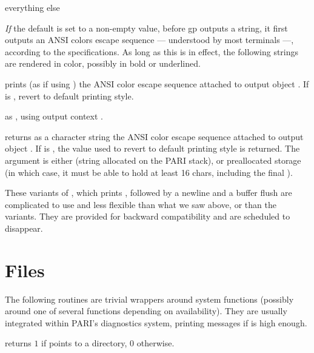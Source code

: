 \item {} everything else

\emph{If} the  default is set to a non-empty value, before gp
outputs a string, it first outputs an ANSI colors escape sequence ---
understood by most terminals ---, according to the 
specifications. As long as this is in effect, the following strings are
rendered in color, possibly in bold or underlined.

 prints (as if using ) the ANSI
color escape sequence attached to output object . If  is
, revert to default printing style.

 as ,
using output context .

 returns as a character
string the ANSI color escape sequence attached to output object .
If  is , the value used to revert to default printing
style is returned. The argument  is either  (string
allocated on the PARI stack), or preallocated storage (in which case, it must
be able to hold at least 16 chars, including the final ).


These variants of , which prints , followed by
a newline and a buffer flush are complicated to use and less flexible
than what we saw above, or than the  variants. They are
provided for backward compatibility and are scheduled to disappear.




\section{Files}

The following routines are trivial wrappers around system functions
(possibly around one of several functions depending on availability).
They are usually integrated within PARI's diagnostics system, printing
messages if  is high enough.

 returns $1$ if  points to
a directory, $0$ otherwise.

